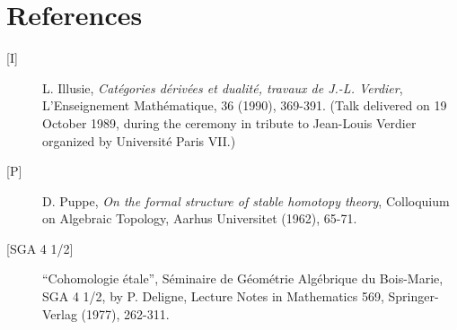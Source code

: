 \section*{References}

\begin{description}
\item[{[I]}] L. Illusie, \emph{Catégories dérivées et dualité, travaux de
J.-L. Verdier}, L'Enseignement Mathématique, 36 (1990), 369-391. (Talk
delivered on 19 October 1989, during the ceremony in tribute to Jean-Louis
Verdier organized by Université Paris VII.)

\item[{[P]}] D. Puppe, \emph{On the formal structure of stable homotopy
theory}, Colloquium on Algebraic Topology, Aarhus Universitet (1962), 65-71.

\item[{[SGA 4 1/2]}] ``Cohomologie étale'', Séminaire de Géométrie Algébrique
du Bois-Marie, SGA 4 1/2, by P. Deligne, Lecture Notes in Mathematics 569,
Springer-Verlag (1977), 262-311.
\end{description}

